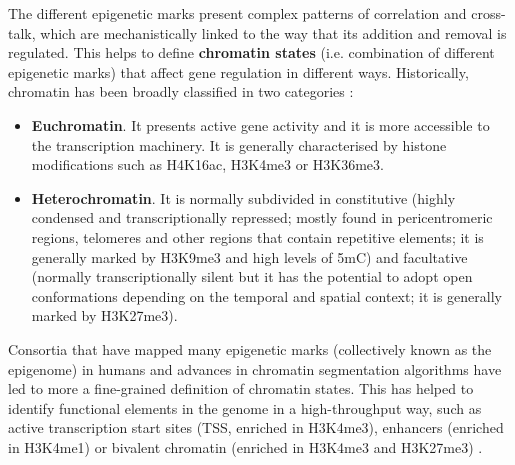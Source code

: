 The different epigenetic marks present complex patterns of correlation and cross-talk, which are mechanistically linked to the way that its addition and removal is regulated. This helps to define \textbf{chromatin states} (i.e. combination of different epigenetic marks) that affect gene regulation in different ways. Historically, chromatin has been broadly classified in two categories \citep{Allis2016,Reinberg2018,Trojer2007}:

\begin{itemize}
	
	\item \textbf{Euchromatin}. It presents active gene activity and it is more accessible to the transcription machinery. It is generally characterised by histone modifications such as H4K16ac, H3K4me3 or H3K36me3.
	
	\item \textbf{Heterochromatin}. It is normally subdivided in constitutive (highly condensed and transcriptionally repressed; mostly found in pericentromeric regions, telomeres and other regions that contain repetitive elements; it is generally marked by H3K9me3 and high levels of \acrshort{5mC}) and facultative (normally transcriptionally silent but it has the potential to adopt open conformations depending on the temporal and spatial context; it is generally marked by H3K27me3).
	
\end{itemize}

Consortia that have mapped many epigenetic marks (collectively known as the epigenome) in humans \citep{Consortium2012, Consortium2015} and advances in chromatin segmentation algorithms \citep{Ernst2010} have led to more a fine-grained definition of chromatin states. This has helped to identify functional elements in the genome in a high-throughput way, such as active transcription start sites (\acrshort{TSS}, enriched in H3K4me3), enhancers (enriched in H3K4me1) or bivalent chromatin (enriched in H3K4me3 and H3K27me3) \citep{Consortium2012, Consortium2015}. 

\bigskip

